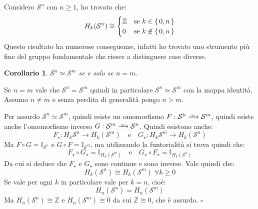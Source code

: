 \documentclass[10pt, twoside=false, x11names]{scrbook}
\newtheorem{corollary}[theorem]{Corollario}
\newenvironment{proof}{{\textbf{Dimostrazione}:}}{\hfill $\square$}
\newcommand{\Z}{\mathbb{Z}}
\newcommand{\Id}[1][]{\mathbb{I}_#1}
\newcommand{\Sph}[1][]{\mathcal{S}^#1}
\newcommand{\homoto}{\xrightarrow{\,\smash{\raisebox{-0.65ex}{\ensuremath{\scriptstyle\sim}}}\,}}
\begin{document}
Considero $ \Sph{n} $ con $ n \geq 1 $, ho trovato che:
\[
  H_k(\Sph{n}) \cong
  \begin{cases}
    \Z & \text{se } k \in \set{0, n} \\
    0 & \text{se } k \not \in \set{0, n}
  \end{cases}
\]
Questo risultato ha numerose conseguenze, infatti ho trovato uno
strumento più fine del gruppo fondamentale che riesce a distinguere
cose diverse.

\begin{corollary}
  $ \Sph{n} \simeq \Sph{m} $ se e solo se $ n = m $.
\end{corollary}
\begin{proof}
Se $ n = m $ vale che $ \Sph{n} = \Sph{m} $ quindi in particolare
$ \Sph{n} \simeq \Sph{m} $ con la mappa identità. Assumo $ n \not = m $
e senza perdita di generalità pongo $ n > m $.

Per assurdo $ \Sph{n} \simeq \Sph{m} $, quindi esiste un omomorfismo
$ F: \Sph{n} \homoto \Sph{m} $, quindi esiste anche l'omomorfismo
inverso $ G: \Sph{m} \homoto \Sph{n} $.
Quindi esistono anche:
\[
  F_\star: H_k{\Sph{n}} \to H_k(\Sph{m}) \quad \text{e} \quad G_\star: H_k{\Sph{m}} \to H_k(\Sph{n})
\]
Ma $ F \circ G = \Id{\Sph{n}} $ e $ G \circ F = \Id{\Sph{m}} $, ma utilizzando
la funtorialità si trova quindi che:
\[
  F_\star \circ G_\star = \Id{H_k(\Sph{m})} \quad \text{e} \quad G_\star \circ F_\star = \Id{H_k(\Sph{n})}
\]
Da cui si deduce che $ F_\star $ e $ G_\star $ sono continue e sono inverse.
Vale quindi che:
\[
  H_k(\Sph{n}) \cong H_k(\Sph{m}) \; \forall k \geq 0
\]
Se vale per ogni $ k $ in particolare vale per $ k = n $, cioè:
\[
  H_n(\Sph{n}) = H_n(\Sph{m})
\]
Ma $ H_n(\Sph{n}) \cong \Z $ e $ H_n(\Sph{m}) \cong 0 $ da cui $ \Z \cong 0 $, che è assurdo.
\end{proof}
\end{document}

